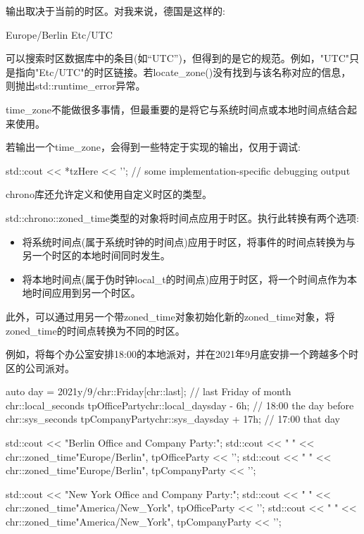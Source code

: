 输出取决于当前的时区。对我来说，德国是这样的:

\begin{shell}
Europe/Berlin
Etc/UTC
\end{shell}

可以搜索时区数据库中的条目(如“UTC”)，但得到的是它的规范。例如，"UTC"只是指向"Etc/UTC"的时区链接。若locate\_zone()没有找到与该名称对应的信息，则抛出std::runtime\_error异常。

time\_zone不能做很多事情，但最重要的是将它与系统时间点或本地时间点结合起来使用。

若输出一个time\_zone，会得到一些特定于实现的输出，仅用于调试:

\begin{cpp}
std::cout << *tzHere << '\n'; // some implementation-specific debugging output
\end{cpp}

chrono库还允许定义和使用自定义时区的类型。


std::chrono::zoned\_time类型的对象将时间点应用于时区。执行此转换有两个选项:

\begin{itemize}
\item
将系统时间点(属于系统时钟的时间点)应用于时区，将事件的时间点转换为与另一个时区的本地时间同时发生。

\item
将本地时间点(属于伪时钟local\_t的时间点)应用于时区，将一个时间点作为本地时间应用到另一个时区。
\end{itemize}

此外，可以通过用另一个带zoned\_time对象初始化新的zoned\_time对象，将zoned\_time的时间点转换为不同的时区。

例如，将每个办公室安排18:00的本地派对，并在2021年9月底安排一个跨越多个时区的公司派对。

\begin{cpp}
auto day = 2021y/9/chr::Friday[chr::last]; // last Friday of month
chr::local_seconds tpOfficeParty{chr::local_days{day} - 6h}; // 18:00 the day before
chr::sys_seconds tpCompanyParty{chr::sys_days{day} + 17h}; // 17:00 that day

std::cout << "Berlin Office and Company Party:\n";
std::cout << " " << chr::zoned_time{"Europe/Berlin", tpOfficeParty} << '\n';
std::cout << " " << chr::zoned_time{"Europe/Berlin", tpCompanyParty} << '\n';

std::cout << "New York Office and Company Party:\n";
std::cout << " " << chr::zoned_time{"America/New_York", tpOfficeParty} << '\n';
std::cout << " " << chr::zoned_time{"America/New_York", tpCompanyParty} << '\n';
\end{cpp}

